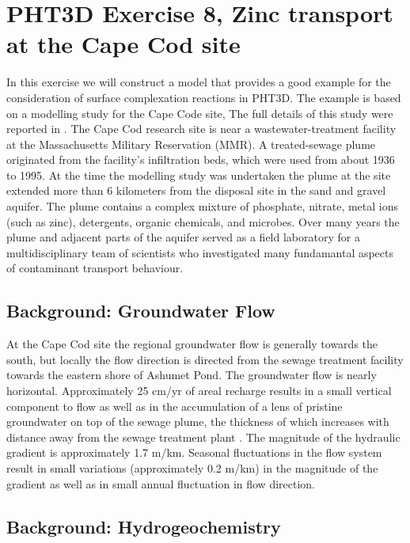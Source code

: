 \section[PHT3D Exercise 8, Zinc transport at the Cape Cod site]{PHT3D Exercise 8, Zinc transport at the Cape Cod site}

In this exercise we will construct a model that provides 
a good example for the consideration of surface complexation reactions in PHT3D.
The example is based on a modelling study for the Cape Code site, 
The full details of this study were reported in \cite{Kent20003411}.    
The Cape Cod research site is near a wastewater-treatment facility at 
the Massachusetts Military Reservation (MMR). A treated-sewage plume originated 
from the facility's infiltration beds, which were used from about 1936 to 1995. 
At the time the modelling study was undertaken the plume at the site extended 
more than 6 kilometers from the disposal site in the 
sand and gravel aquifer. The plume contains a complex mixture of phosphate, nitrate, 
metal ions (such as zinc), detergents, organic chemicals, and microbes. 
Over many years the plume and adjacent parts of the aquifer  
served as a field laboratory for a multidisciplinary team of scientists 
who investigated many fundamantal aspects 
of contaminant transport behaviour.

\subsection{Background: Groundwater Flow}

At the Cape Cod site the regional groundwater flow is generally towards 
the south, but locally the flow direction is directed from the 
sewage treatment facility towards the eastern shore of Ashumet Pond.  
The groundwater flow is nearly horizontal.
Approximately 25 cm/yr of areal recharge results
in a small vertical component to flow as well as
in the accumulation of a lens of pristine groundwater on top of 
the sewage plume, the thickness of which increases with 
distance away from the sewage 
treatment plant \citep[]{Leblanc1984,Leblanc1991895}.  
The magnitude of the hydraulic gradient 
is approximately 1.7 m/km. 
Seasonal fluctuations in the flow system result in small 
variations (approximately 0.2 m/km) in the magnitude
of the gradient as well as in small annual fluctuation 
in flow direction.

\subsection{Background: Hydrogeochemistry}

